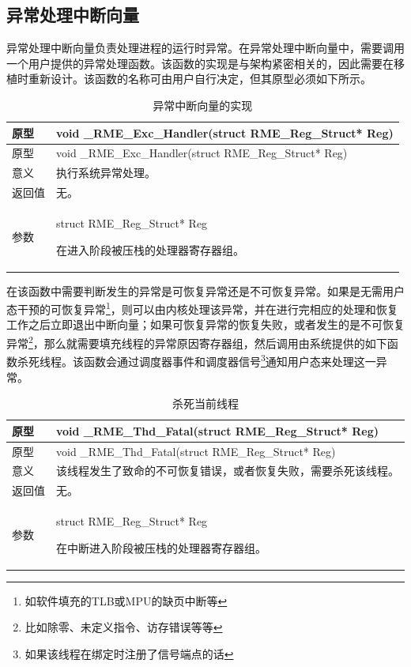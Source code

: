 \subsection{异常处理中断向量}\label{subsec:7-exception-handling-interrupt-vector}

异常处理中断向量负责处理进程的运行时异常。在异常处理中断向量中，需要调用一个用户提供的异常处理函数。该函数的实现是与架构紧密相关的，因此需要在移植时重新设计。该函数的名称可由用户自行决定，但其原型必须如下所示。

\begin{xltabular}{\textwidth}{@{}>{\hsize\raggedright\arraybackslash}X>{\hsize\raggedright\arraybackslash}X@{}}
\caption{异常中断向量的实现}\label{tab:7-21-exception-interrupt-vector-implementation}\\
\toprule
原型 & void \_RME\_Exc\_Handler(struct RME\_Reg\_Struct*
Reg)\tabularnewline
\endfirsthead
\toprule
原型 & void \_RME\_Exc\_Handler(struct RME\_Reg\_Struct*
Reg)\tabularnewline
\midrule
\endhead
\bottomrule
\endlastfoot
意义 & 执行系统异常处理。\tabularnewline
返回值 & 无。\tabularnewline
参数\strut
 & struct RME\_Reg\_Struct* Reg

在进入阶段被压栈的处理器寄存器组。\strut
\tabularnewline
\end{xltabular}

在该函数中需要判断发生的异常是可恢复异常还是不可恢复异常。如果是无需用户态干预的可恢复异常\footnote{如软件填充的TLB或MPU的缺页中断等}，则可以由内核处理该异常，并在进行完相应的处理和恢复工作之后立即退出中断向量；如果可恢复异常的恢复失败，或者发生的是不可恢复异常\footnote{比如除零、未定义指令、访存错误等等}，那么就需要填充线程的异常原因寄存器组，然后调用由系统提供的如下函数杀死线程。该函数会通过调度器事件和调度器信号\footnote{如果该线程在绑定时注册了信号端点的话}通知用户态来处理这一异常。

\begin{xltabular}{\textwidth}{@{}>{\hsize\raggedright\arraybackslash}X>{\hsize\raggedright\arraybackslash}X@{}}
\caption{杀死当前线程}\label{tab:7-22-kill-current-thread}\\
\toprule
原型 & void \_RME\_Thd\_Fatal(struct RME\_Reg\_Struct* Reg)\tabularnewline
\endfirsthead
\toprule
原型 & void \_RME\_Thd\_Fatal(struct RME\_Reg\_Struct* Reg)\tabularnewline
\midrule
\endhead
\bottomrule
\endlastfoot
意义 &
该线程发生了致命的不可恢复错误，或者恢复失败，需要杀死该线程。\tabularnewline
返回值 & 无。\tabularnewline
参数\strut
 & struct RME\_Reg\_Struct* Reg

在中断进入阶段被压栈的处理器寄存器组。\strut
\tabularnewline
\end{xltabular}

